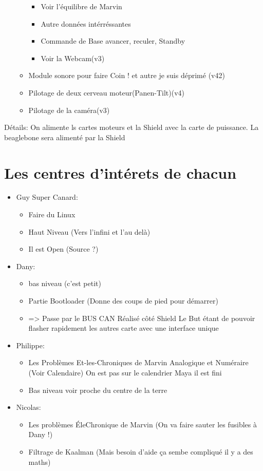 \documentclass[10pt,a4paper]{article}
\begin{document}
\begin{itemize}
\begin{itemize}
\begin{itemize}
            		\item Voir l'équilibre de Marvin
            		\item Autre données intérréssantes
            		\item  Commande de Base avancer, reculer, Standby
            		\item Voir la Webcam(v3)
            	\end{itemize}
        	\item Module sonore pour faire Coin ! et autre je suis déprimé (v42)
        	\item Pilotage de deux cerveau moteur(Panen-Tilt)(v4)
        	\item Pilotage de la caméra(v3)
  	\end{itemize}
    \end{itemize}
    Détails: On alimente ls cartes moteurs et la Shield avec la carte de puissance. La beaglebone sera alimenté par la Shield
\section{Les centres d'intérets de chacun}

\begin{itemize}
\item Guy Super Canard: 
    \begin{itemize}
    \item Faire du Linux
    \item Haut Niveau (Vers l'infini et l'au delà)
    \item Il est Open (Source ?)
    \end{itemize}
\item Dany:
    \begin{itemize}
    \item bas niveau (c'est petit)
    \item Partie Bootloader (Donne des coups de pied pour démarrer)
    \item => Passe par le BUS CAN Réalisé côté Shield Le But étant de pouvoir flasher rapidement les autres carte avec une interface unique
    \end{itemize}
\item Philippe:
    \begin{itemize}
    \item Les Problèmes Et-les-Chroniques de Marvin Analogique et Numéraire (Voir Calendaire) On est pas sur le calendrier Maya il est fini
    \item Bas niveau voir proche du centre de la terre
    \end{itemize}
\item  Nicolas:
    \begin{itemize}
    \item Les problèmes ÉleChronique de Marvin (On va faire sauter les fusibles à Dany !)
    \item Filtrage de Kaalman (Mais besoin d'aide ça sembe compliqué il y a des maths)
    \end{itemize}
\end{itemize}
\end{document}
